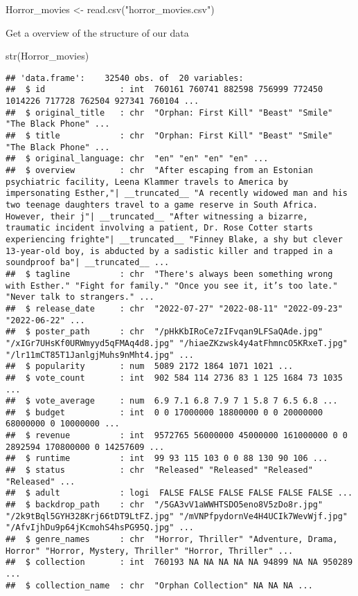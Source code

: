 \documentclass[
]{article}
\newenvironment{Shaded}{\begin{snugshade}}{\end{snugshade}}
\newcommand{\FunctionTok}[1]{\textcolor[rgb]{0.00,0.00,0.00}{#1}}
\newcommand{\NormalTok}[1]{#1}
\newcommand{\OtherTok}[1]{\textcolor[rgb]{0.56,0.35,0.01}{#1}}
\newcommand{\StringTok}[1]{\textcolor[rgb]{0.31,0.60,0.02}{#1}}
\begin{document}
\begin{Shaded}
\begin{Highlighting}[]
\NormalTok{Horror\_movies }\OtherTok{\textless{}{-}} \FunctionTok{read.csv}\NormalTok{(}\StringTok{"horror\_movies.csv"}\NormalTok{)}
\end{Highlighting}
\end{Shaded}

Get a overview of the structure of our data

\begin{Shaded}
\begin{Highlighting}[]
\FunctionTok{str}\NormalTok{(Horror\_movies)}
\end{Highlighting}
\end{Shaded}

\begin{verbatim}
## 'data.frame':    32540 obs. of  20 variables:
##  $ id               : int  760161 760741 882598 756999 772450 1014226 717728 762504 927341 760104 ...
##  $ original_title   : chr  "Orphan: First Kill" "Beast" "Smile" "The Black Phone" ...
##  $ title            : chr  "Orphan: First Kill" "Beast" "Smile" "The Black Phone" ...
##  $ original_language: chr  "en" "en" "en" "en" ...
##  $ overview         : chr  "After escaping from an Estonian psychiatric facility, Leena Klammer travels to America by impersonating Esther,"| __truncated__ "A recently widowed man and his two teenage daughters travel to a game reserve in South Africa. However, their j"| __truncated__ "After witnessing a bizarre, traumatic incident involving a patient, Dr. Rose Cotter starts experiencing frighte"| __truncated__ "Finney Blake, a shy but clever 13-year-old boy, is abducted by a sadistic killer and trapped in a soundproof ba"| __truncated__ ...
##  $ tagline          : chr  "There's always been something wrong with Esther." "Fight for family." "Once you see it, it’s too late." "Never talk to strangers." ...
##  $ release_date     : chr  "2022-07-27" "2022-08-11" "2022-09-23" "2022-06-22" ...
##  $ poster_path      : chr  "/pHkKbIRoCe7zIFvqan9LFSaQAde.jpg" "/xIGr7UHsKf0URWmyyd5qFMAq4d8.jpg" "/hiaeZKzwsk4y4atFhmncO5KRxeT.jpg" "/lr11mCT85T1JanlgjMuhs9nMht4.jpg" ...
##  $ popularity       : num  5089 2172 1864 1071 1021 ...
##  $ vote_count       : int  902 584 114 2736 83 1 125 1684 73 1035 ...
##  $ vote_average     : num  6.9 7.1 6.8 7.9 7 1 5.8 7 6.5 6.8 ...
##  $ budget           : int  0 0 17000000 18800000 0 0 20000000 68000000 0 10000000 ...
##  $ revenue          : int  9572765 56000000 45000000 161000000 0 0 2892594 170800000 0 14257609 ...
##  $ runtime          : int  99 93 115 103 0 0 88 130 90 106 ...
##  $ status           : chr  "Released" "Released" "Released" "Released" ...
##  $ adult            : logi  FALSE FALSE FALSE FALSE FALSE FALSE ...
##  $ backdrop_path    : chr  "/5GA3vV1aWWHTSDO5eno8V5zDo8r.jpg" "/2k9tBql5GYH328Krj66tDT9LtFZ.jpg" "/mVNPfpydornVe4H4UCIk7WevWjf.jpg" "/AfvIjhDu9p64jKcmohS4hsPG95Q.jpg" ...
##  $ genre_names      : chr  "Horror, Thriller" "Adventure, Drama, Horror" "Horror, Mystery, Thriller" "Horror, Thriller" ...
##  $ collection       : int  760193 NA NA NA NA NA 94899 NA NA 950289 ...
##  $ collection_name  : chr  "Orphan Collection" NA NA NA ...
\end{verbatim}
\end{document}
